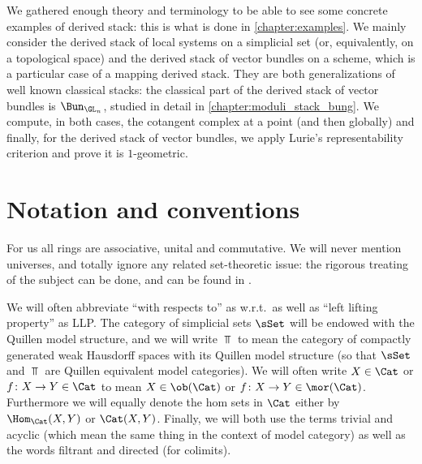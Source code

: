     We gathered enough theory and terminology to be able to see some concrete examples of derived stack: this is what is done in \cref{chapter:examples}. We mainly consider the derived stack of local systems on a simplicial set (or, equivalently, on a topological space) and the derived stack of vector bundles on a scheme, which is a particular case of a mapping derived stack. They are both generalizations of well known classical stacks: the classical part of the derived stack of vector bundles is $\Bun_{\GL_n}$, studied in detail in \cref{chapter:moduli_stack_bung}. We compute, in both cases, the cotangent complex at a point (and then globally) and finally, for the derived stack of vector bundles, we apply Lurie's representability criterion and prove it is $1$-geometric. 

    \section*{Notation and conventions}
        For us all rings are associative, unital and commutative. We will never mention universes, and totally ignore any related set-theoretic issue: the rigorous treating of the subject can be done, and can be found in \cite{ToVe:hag2}. 
        
        We will often abbreviate ``with respects to'' as w.r.t.\ as well as ``left lifting property'' as LLP.
        The category of simplicial sets $\sSet$ will be endowed with the Quillen model structure, and we will write $\Top$ to mean the category of compactly generated weak Hausdorff spaces with its Quillen model structure (so that $\sSet$ and $\Top$ are Quillen equivalent model categories). We will often write $X \in \Cat$ or $f\colon X \to Y \in \Cat$ to mean $X \in \ob(\Cat)$ or $f\colon X \to Y \in \mor(\Cat)$. Furthermore we will equally denote the hom sets in $\Cat$ either by $\Hom_{\Cat}(X, Y)$ or $\Cat(X, Y)$. Finally, we will both use the terms trivial and acyclic (which mean the same thing in the context of model category) as well as the words filtrant and directed (for colimits). 
